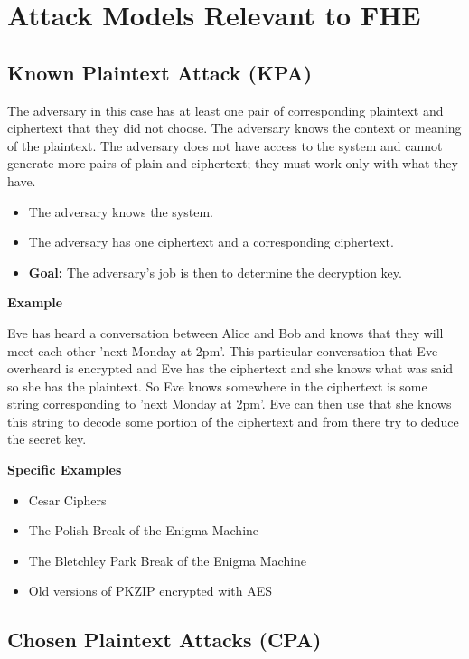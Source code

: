 \section{Attack Models Relevant to FHE}

\subsection*{Known Plaintext Attack (KPA)}

The adversary in this case has at least one pair of corresponding plaintext and ciphertext that they did not choose.
The adversary knows the context or meaning of the plaintext.
The adversary does not have access to the system and cannot generate more pairs of plain and ciphertext; they must work only with what they have.


\begin{itemize}
\item The adversary knows the system.
\item The adversary has one ciphertext and a corresponding ciphertext.
\item \textbf{Goal:} The adversary’s job is then to determine the decryption key.
\end{itemize}


\textbf{Example}


Eve has heard a conversation between Alice and Bob and knows that they will meet each other 'next Monday at 2pm'.
This particular conversation that Eve overheard is encrypted and Eve has the ciphertext and she knows what was said so she has the plaintext. 
So Eve knows somewhere in the ciphertext is some string corresponding to 'next Monday at 2pm'. 
Eve can then use that she knows this string to decode some portion of the ciphertext and from there try to deduce the secret key. 


\textbf{Specific Examples}


\begin{itemize}
\item Cesar Ciphers
\item The Polish Break of the Enigma Machine
\item The Bletchley Park Break of the Enigma Machine
\item Old versions of PKZIP encrypted with AES
\end{itemize}



\subsection*{Chosen Plaintext Attacks (CPA)}


